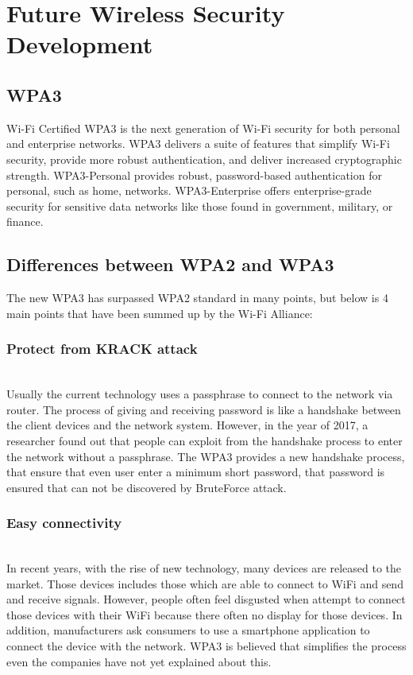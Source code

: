 \section{Future Wireless Security Development}
\subsection{WPA3 \cite{hoffman_2018}}
Wi-Fi Certified WPA3 is the next generation of Wi-Fi security for both personal and enterprise networks. WPA3  \cite{hoffman_2018} delivers a suite of features that simplify Wi-Fi security, provide more robust authentication, and deliver increased cryptographic strength. WPA3-Personal  \cite{hoffman_2018}provides robust, password-based authentication for personal, such as home, networks. WPA3-Enterprise  \cite{hoffman_2018} offers enterprise-grade security for sensitive data networks like those found in government, military, or finance.
\subsection{Differences between WPA2 and WPA3 \cite{hoffman_2018}}
The new WPA3 \cite{hoffman_2018} has surpassed WPA2 standard in many points, but below is 4 main points that have been summed up by the Wi-Fi Alliance:
\subsubsection{Protect from KRACK attack}~\\
Usually the current technology uses a passphrase to connect to the network via router. The process of giving and receiving password is like a handshake between the client devices and the network system. However, in the year of 2017, a researcher found out that people can exploit from the handshake process to enter the network without a passphrase.
The WPA3 provides a new handshake process, that ensure that even user enter a minimum short password, that password is ensured that can not be discovered by BruteForce attack.
\subsubsection{Easy connectivity}~\\
In recent years, with the rise of new technology, many devices are released to the market. Those devices includes those which are able to connect to WiFi and send and receive signals. However, people often feel disgusted when attempt to connect those devices with their WiFi because there often no display for those devices. In addition, manufacturers ask consumers to use a smartphone application to connect the device with the network.
WPA3 \cite{hoffman_2018} is believed that simplifies the process even the companies have not yet explained about this.
